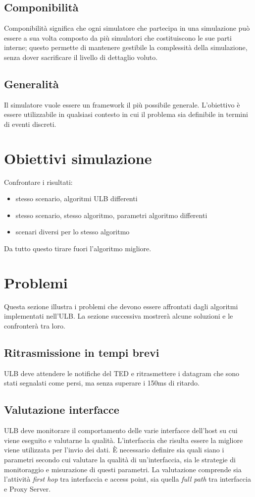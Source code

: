 \documentclass[12pt,a4paper,openright,twoside]{book}
\begin{document}
\subsection{Componibilità}
Componibilità significa che ogni simulatore che partecipa in una
simulazione può essere a sua volta composto da più simulatori che
costituiscono le sue parti interne; questo permette di mantenere
gestibile la complessità della simulazione, senza dover sacrificare il
livello di dettaglio voluto.

\subsection{Generalità}
Il simulatore vuole essere un framework il più possibile
generale. L'obiettivo è essere utilizzabile in qualsiasi contesto in
cui il problema sia definibile in termini di eventi discreti.


\section{Obiettivi simulazione}
Confrontare i risultati:
\begin{itemize}
\item stesso scenario, algoritmi ULB differenti
\item stesso scenario, stesso algoritmo, parametri algoritmo differenti
\item scenari diversi per lo stesso algoritmo
\end{itemize}
Da tutto questo tirare fuori l'algoritmo migliore.

\section{Problemi}
Questa sezione illustra i problemi che devono essere affrontati dagli
algoritmi implementati nell'ULB. La sezione successiva mostrerà alcune
soluzioni e le confronterà tra loro.

\subsection{Ritrasmissione in tempi brevi}
ULB deve attendere le notifiche del TED e ritrasmettere i datagram che
sono stati segnalati come persi, ma senza superare i 150ms di ritardo.

\subsection{Valutazione interfacce}
ULB deve monitorare il comportamento delle varie interfacce dell'host
su cui viene eseguito e valutarne la qualità. L'interfaccia che
risulta essere la migliore viene utilizzata per l'invio dei dati. È
necessario definire sia quali siano i parametri secondo cui valutare
la qualità di un'interfaccia, sia le strategie di monitoraggio e
misurazione di questi parametri. La valutazione comprende sia
l'attività \emph{first hop} tra interfaccia e access point, sia quella
\emph{full path} tra interfaccia e Proxy Server.
\end{document}
